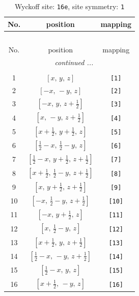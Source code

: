 \documentclass[fleqn,8pt]{jsarticle}
\begin{document}
\begin{longtable}{ccc}
\caption{Wyckoff site: {\tt 16e}, site symmetry: {\tt 1}}
 \\
 \hline \hline
No. & position & mapping \\ \hline \endfirsthead

\multicolumn{2}{l}{\tablename\ \thetable{}} \\
 \hline \hline
No. & position & mapping \\ \hline \endhead

 \hline \hline
\multicolumn{2}{r}{\footnotesize\it continued ...} \\ \endfoot

 \hline \hline
\multicolumn{2}{r}{} \\ \endlastfoot

1 & $\left[ x,\, y,\, z \right]$ & {\tt [1]} \\ \hline
2 & $\left[ - x,\, - y,\, z \right]$ & {\tt [2]} \\ \hline
3 & $\left[ - x,\, y,\, z + \frac{1}{2} \right]$ & {\tt [3]} \\ \hline
4 & $\left[ x,\, - y,\, z + \frac{1}{2} \right]$ & {\tt [4]} \\ \hline
5 & $\left[ x + \frac{1}{2},\, y + \frac{1}{2},\, z \right]$ & {\tt [5]} \\ \hline
6 & $\left[ \frac{1}{2} - x,\, \frac{1}{2} - y,\, z \right]$ & {\tt [6]} \\ \hline
7 & $\left[ \frac{1}{2} - x,\, y + \frac{1}{2},\, z + \frac{1}{2} \right]$ & {\tt [7]} \\ \hline
8 & $\left[ x + \frac{1}{2},\, \frac{1}{2} - y,\, z + \frac{1}{2} \right]$ & {\tt [8]} \\ \hline
9 & $\left[ x,\, y + \frac{1}{2},\, z + \frac{1}{2} \right]$ & {\tt [9]} \\ \hline
10 & $\left[ - x,\, \frac{1}{2} - y,\, z + \frac{1}{2} \right]$ & {\tt [10]} \\ \hline
11 & $\left[ - x,\, y + \frac{1}{2},\, z \right]$ & {\tt [11]} \\ \hline
12 & $\left[ x,\, \frac{1}{2} - y,\, z \right]$ & {\tt [12]} \\ \hline
13 & $\left[ x + \frac{1}{2},\, y,\, z + \frac{1}{2} \right]$ & {\tt [13]} \\ \hline
14 & $\left[ \frac{1}{2} - x,\, - y,\, z + \frac{1}{2} \right]$ & {\tt [14]} \\ \hline
15 & $\left[ \frac{1}{2} - x,\, y,\, z \right]$ & {\tt [15]} \\ \hline
16 & $\left[ x + \frac{1}{2},\, - y,\, z \right]$ & {\tt [16]} \\
\end{longtable}
\end{document}
